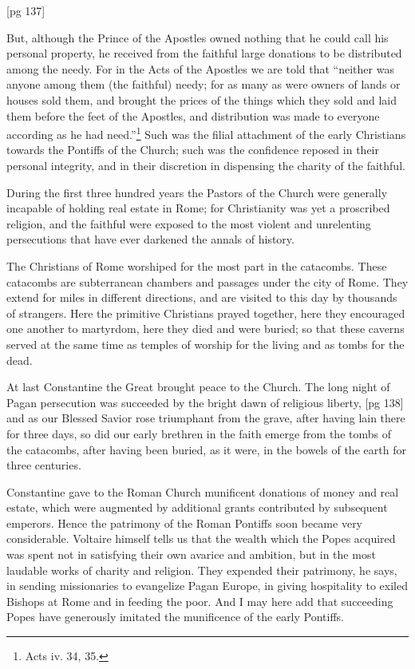 [pg 137]

But, although the Prince of the Apostles owned
nothing that he could call his personal property,
he received from the faithful large donations to
be distributed among the needy. For in the Acts
of the Apostles we are told that “neither was anyone
among them (the faithful) needy; for as many
as were owners of lands or houses sold them, and
brought the prices of the things which they sold
and laid them before the feet of the Apostles, and
distribution was made to everyone according as
he had need.”\footnote{Acts iv.
34, 35.} Such was the filial attachment of
the early Christians towards the Pontiffs of the
Church; such was the confidence reposed in their
personal integrity, and in their discretion in dispensing
the charity of the faithful.

During the first three hundred years the Pastors
of the Church were generally incapable of
holding real estate in Rome; for Christianity was
yet a proscribed religion, and the faithful were
exposed to the most violent and unrelenting persecutions
that have ever darkened the annals of
history.

The Christians of Rome worshiped for the
most part in the catacombs. These catacombs are
subterranean chambers and passages under the
city of Rome. They extend for miles in different
directions, and are visited to this day by thousands
of strangers. Here the primitive Christians
prayed together, here they encouraged one another
to martyrdom, here they died and were
buried; so that these caverns served at the same
time as temples of worship for the living and as
tombs for the dead.

At last Constantine the Great brought peace to
the Church. The long night of Pagan persecution
was succeeded by the bright dawn of religious liberty,
[pg 138]
and as our Blessed Savior rose triumphant
from the grave, after having lain there for three
days, so did our early brethren in the faith emerge
from the tombs of the catacombs, after having been
buried, as it were, in the bowels of the earth for
three centuries.

Constantine gave to the Roman Church munificent
donations of money and real estate, which
were augmented by additional grants contributed
by subsequent emperors. Hence the patrimony of
the Roman Pontiffs soon became very considerable.
Voltaire himself tells us that the wealth
which the Popes acquired was spent not in satisfying
their own avarice and ambition, but in the
most laudable works of charity and religion. They
expended their patrimony, he says, in sending missionaries
to evangelize Pagan Europe, in giving
hospitality to exiled Bishops at Rome and in feeding
the poor. And I may here add that succeeding
Popes have generously imitated the munificence
of the early Pontiffs.

